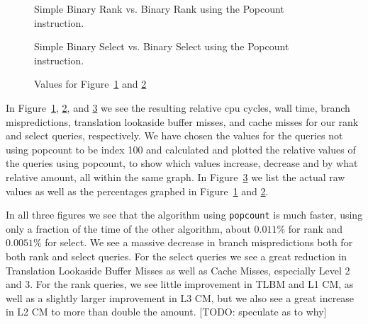\begin{figure}
\caption{Simple Binary Rank vs. Binary Rank using the Popcount instruction.}
\label{fig:rankPopcountDiff}

\end{figure}

\begin{figure}
\caption{Simple Binary Select vs. Binary Select using the Popcount instruction.}
\label{fig:selectPopcountDiff}

\end{figure}

\begin{figure}
\center
\caption{Values for Figure~\ref{fig:rankPopcountDiff} and \ref{fig:selectPopcountDiff}}
\label{fig:valuesForPopcountDiff}

\end{figure}

In Figure~\ref{fig:rankPopcountDiff}, \ref{fig:selectPopcountDiff}, and \ref{fig:valuesForPopcountDiff} we see the resulting relative cpu cycles, wall time, branch mispredictions, translation lookaside buffer misses, and cache misses for our rank and select queries, respectively.
We have chosen the values for the queries not using popcount to be index 100 and calculated and plotted the relative values of the queries using popcount, to show which values increase, decrease and by what relative amount, all within the same graph.
In Figure~\ref{fig:valuesForPopcountDiff} we list the actual raw values as well as the percentages graphed in Figure~\ref{fig:rankPopcountDiff} and \ref{fig:selectPopcountDiff}.

In all three figures we see that the algorithm using \texttt{popcount} is much faster, using only a fraction of the time of the other algorithm, about $0.011\%$ for rank and $0.0051\%$ for select.
We see a massive decrease in branch mispredictions both for both rank and select queries. For the select queries we see a great reduction in Translation Lookaside Buffer Misses as well as Cache Misses, especially Level 2 and 3.
For the rank queries, we see little improvement in TLBM and L1 CM, as well as a slightly larger improvement in L3 CM, but we also see a great increase in L2 CM to more than double the amount.
[TODO: speculate as to why]


